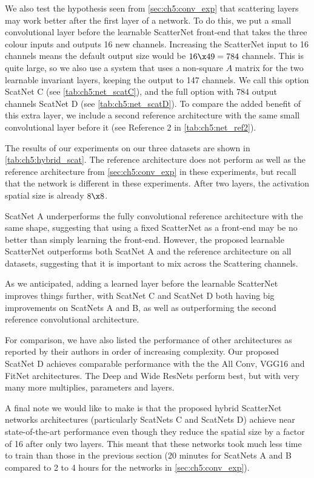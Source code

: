 We also test the hypothesis seen from \autoref{sec:ch5:conv_exp} that scattering layers may 
work better after the first layer of a network. To do this, we put a small
convolutional layer before the learnable ScatterNet front-end that takes the
three colour inputs and outputs 16 new channels. Increasing the ScatterNet input
to 16 channels means the default output size would be $16\x 49=784$ channels.
This is quite large, so we also use a system that uses a non-square $A$ matrix
for the two learnable invariant layers, keeping the output to 147 channels. We call this
option ScatNet C (see \autoref{tab:ch5:net_scatC}), and the full option with 
$784$ output channels ScatNet D (see \autoref{tab:ch5:net_scatD}). To compare
the added benefit of this extra layer, we include a second reference
architecture with the same small convolutional layer before it (see Reference 2 in 
\autoref{tab:ch5:net_ref2}).

The results of our experiments on our three datasets are shown in
\autoref{tab:ch5:hybrid_scat}. The reference architecture does not perform as
well as the reference architecture from \autoref{sec:ch5:conv_exp} in these
experiments, but recall that the network is different in these experiments. After
two layers, the activation spatial size is already $8\x 8$.

ScatNet A underperforms the 
fully convolutional reference architecture with the same shape, suggesting that
using a fixed ScatterNet as a front-end may be no better than simply learning the front-end.
However, the proposed learnable ScatterNet outperforms both ScatNet A and the reference
architecture on all datasets, suggesting that it is important to mix across the
Scattering channels.

As we anticipated, adding a learned layer before the learnable ScatterNet
improves things further, with ScatNet C and ScatNet D both having big improvements on
ScatNets A and B, as well as outperforming the second reference convolutional
architecture. 

For comparison, we have also listed the performance of other architectures as
reported by their authors in order of increasing complexity. Our proposed ScatNet D achieves
comparable performance with the the All Conv, VGG16 and FitNet architectures.
The Deep\cite{he_identity_2016} and Wide\cite{zagoruyko_wide_2016}
ResNets perform best, but with very many more
multiplies, parameters and layers.

A final note we would like to make is that the proposed hybrid ScatterNet networks 
architectures (particularly ScatNets C and ScatNets D) achieve near
state-of-the-art performance even though they reduce the spatial size by a
factor of 16 after only two layers. This meant that these networks took much
less time to train than those in the previous section (20 minutes for ScatNets A
and B compared to 2 to 4 hours for the networks in \autoref{sec:ch5:conv_exp}).

